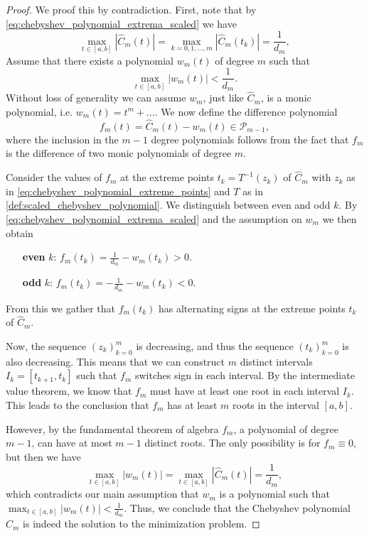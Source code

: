 \begin{proof}
  We proof this by contradiction. First, note that by \cref{eq:chebyshev_polynomial_extrema_scaled} we have
  \[
    \max_{t\in[a,b]} |\hat{C}_m(t)| = \max_{k=0,1,\dots,m} |\hat{C}_m(t_k)| = \frac{1}{d_m},
  \]
  Assume that there exists a polynomial $w_m(t)$ of degree $m$ such that
  \[
    \max_{t\in[a,b]} |w_m(t)| < \frac{1}{d_m}.
  \]
  Without loss of generality we can assume $w_m$, just like $\hat{C}_m$, is a monic polynomial, i.e. $w_m(t) = t^m + \dots$. We now define the difference polynomial
  \[
    f_m(t) = \hat{C}_m(t) - w_m(t) \in \mathcal{P}_{m-1},
  \]
  where the inclusion in the $m-1$ degree polynomials follows from the fact that $f_m$ is the difference of two monic polynomials of degree $m$. 

  Consider the values of $f_m$ at the extreme points $t_k = T^{-1}(z_k)$ of $\hat{C}_m$ with $z_k$ as in \cref{eq:chebyshev_polynomial_extreme_points} and $T$ as in \cref{def:scaled_chebyshev_polynomial}. We distinguish between even and odd $k$. By \cref{eq:chebyshev_polynomial_extrema_scaled} and the assumption on $w_m$ we then obtain
  \begin{enumerate}[leftmargin=1.3cm]
    \item[\textbf{even} $k$:] $f_m(t_k) = \frac{1}{d_m} - w_m(t_k) > 0$.
    \item[\textbf{odd} $k$:] $f_m(t_k) =  -\frac{1}{d_m} - w_m(t_k) < 0$. 
  \end{enumerate}
  From this we gather that $f_m(t_k)$ has alternating signs at the extreme points $t_k$ of $\hat{C}_m$. 

  Now, the sequence $(z_k)_{k=0}^m$ is decreasing, and thus the sequence $(t_k)_{k=0}^m$ is also decreasing. This means that we can construct $m$ distinct intervals $I_k = [t_{k+1}, t_k]$ such that $f_m$ switches sign in each interval. By the intermediate value theorem, we know that $f_m$ must have at least one root in each interval $I_k$. This leads to the conclusion that $f_m$ has at least $m$ roots in the interval $[a, b]$. 

  However, by the fundamental theorem of algebra $f_m$, a polynomial of degree $m-1$, can have at most $m-1$ distinct roots. The only possibility is for $f_m \equiv 0$, but then we have
  \[
    \max_{t\in[a,b]} |w_m(t)| = \max_{t\in[a,b]} |\hat{C}_m(t)| = \frac{1}{d_m},
  \]
  which contradicts our main assumption that $w_m$ is a polynomial such that $\max_{t\in[a,b]} |w_m(t)| < \frac{1}{d_m}$. Thus, we conclude that the Chebyshev polynomial $\hat{C}_m$ is indeed the solution to the minimization problem.
\end{proof}


